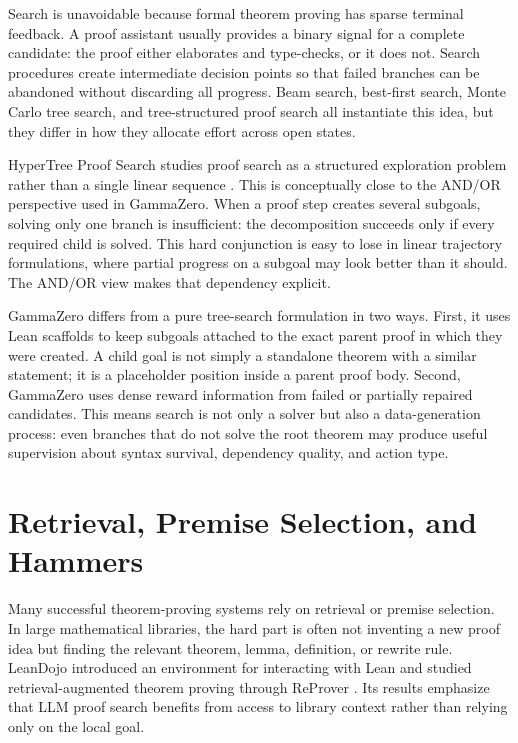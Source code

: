 Search is unavoidable because formal theorem proving has sparse terminal feedback. A proof assistant
usually provides a binary signal for a complete candidate: the proof either elaborates and type-checks, or
it does not. Search procedures create intermediate decision points so that failed branches can be
abandoned without discarding all progress. Beam search, best-first search, Monte Carlo tree search, and
tree-structured proof search all instantiate this idea, but they differ in how they allocate effort across
open states.

HyperTree Proof Search studies proof search as a structured exploration problem rather than a single
linear sequence \citep{lample2022hypertree}. This is conceptually close to the AND/OR perspective used
in GammaZero. When a proof step creates several subgoals, solving only one branch is insufficient:
the decomposition succeeds only if every required child is solved. This hard conjunction is easy to lose
in linear trajectory formulations, where partial progress on a subgoal may look better than it should.
The AND/OR view makes that dependency explicit.

GammaZero differs from a pure tree-search formulation in two ways. First, it uses Lean scaffolds to keep
subgoals attached to the exact parent proof in which they were created. A child goal is not simply a
standalone theorem with a similar statement; it is a placeholder position inside a parent proof body.
Second, GammaZero uses dense reward information from failed or partially repaired candidates. This
means search is not only a solver but also a data-generation process: even branches that do not solve the
root theorem may produce useful supervision about syntax survival, dependency quality, and action type.

\section{Retrieval, Premise Selection, and Hammers}

Many successful theorem-proving systems rely on retrieval or premise selection. In large mathematical
libraries, the hard part is often not inventing a new proof idea but finding the relevant theorem, lemma,
definition, or rewrite rule. LeanDojo introduced an environment for interacting with Lean and studied
retrieval-augmented theorem proving through ReProver \citep{yang2023leandojo}. Its results emphasize
that LLM proof search benefits from access to library context rather than relying only on the local goal.

